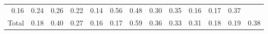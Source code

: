 \begin{table}[!h]
\begin{tabular}{lllllllllllll}
  \multicolumn{1}{|r}{0.16} &
  \multicolumn{1}{r}{0.24} &
  \multicolumn{1}{r}{0.26} &
  \multicolumn{1}{r}{0.22} &
  \multicolumn{1}{r}{0.14} &
  \multicolumn{1}{r}{0.56} &
  \multicolumn{1}{r}{0.48} &
  \multicolumn{1}{r}{0.30} &
  \multicolumn{1}{r}{0.35} &
  \multicolumn{1}{r}{0.16} &
  \multicolumn{1}{r}{0.17} &
  \multicolumn{1}{r}{0.37} \\
\multicolumn{1}{l}{\hspace{1em}Total} &
  \multicolumn{1}{|r}{0.18} &
  \multicolumn{1}{r}{0.40} &
  \multicolumn{1}{r}{0.27} &
  \multicolumn{1}{r}{0.16} &
  \multicolumn{1}{r}{0.17} &
  \multicolumn{1}{r}{0.59} &
  \multicolumn{1}{r}{0.36} &
  \multicolumn{1}{r}{0.33} &
  \multicolumn{1}{r}{0.31} &
  \multicolumn{1}{r}{0.18} &
  \multicolumn{1}{r}{0.19} &
  \multicolumn{1}{r}{0.38} \\
\cline{1-13}
\end{tabular}
\end{table}
